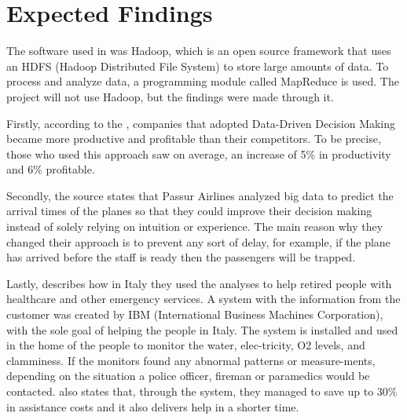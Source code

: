 \section{Expected Findings}
The software used in \cite{bigData} was Hadoop, which is an open source framework that uses an HDFS (Hadoop Distributed File System) to store large amounts of data. To process and analyze data, a programming module called MapReduce is used.  The project will not use Hadoop, but the findings were made through it.   

Firstly, according to the \cite{bigData}, companies that adopted Data-Driven Decision Making became more productive and profitable than their competitors.  To be precise, those who used this approach saw on average, an increase of 5\% in productivity and 6\% profitable.  

Secondly, the source states that Passur Airlines analyzed big data to predict the arrival times of the planes so that they could improve their decision making instead of solely relying on intuition or experience.  The main reason why they changed their approach is to prevent any sort of delay, for example, if the plane has arrived before the staff is ready then the passengers will be trapped.

Lastly, \cite{bigData} describes how in Italy they used the analyses to help retired people with healthcare and other emergency services. A system with the information from the customer was created by IBM (International Business Machines Corporation), with the sole goal of helping the people in Italy. The system is installed and used in the home of the people to monitor the water, elec-tricity, O2 levels, and clamminess. If the monitors found any abnormal patterns or measure-ments, depending on the situation a police officer, fireman or paramedics would be contacted. \cite{bigData} also states that, through the system, they managed to save up to 30\% in assistance costs and it also delivers help in a shorter time. 